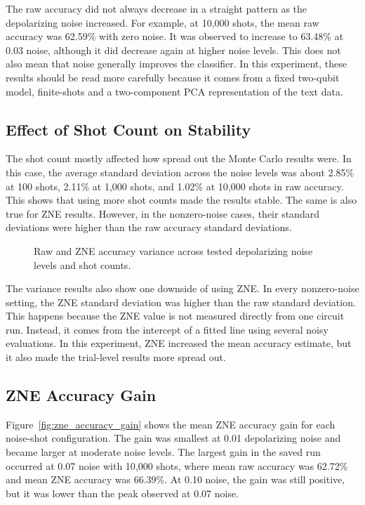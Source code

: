 \documentclass[conference]{IEEEtran}
\begin{document}
The raw accuracy did not always decrease in a straight pattern as the
depolarizing noise increased. For example, at 10{,}000 shots, the mean raw
accuracy was 62.59\% with zero noise. It was observed to increase to 63.48\% at 0.03 noise,
although it did decrease again at higher noise levels. This does not also mean that noise
generally improves the classifier. In this experiment, these results should be read
more carefully because it comes from a fixed two-qubit model, finite-shots
and a two-component PCA representation of the text data.

\subsection{Effect of Shot Count on Stability}

The shot count mostly affected how spread out the Monte Carlo results were. In this case,
the average standard deviation across the noise levels was about 2.85\% at 100 shots, 
2.11\% at 1{,}000 shots, and 1.02\% at 10{,}000 shots in raw accuracy. This
shows that using more shot counts made the results stable. The same is also true for 
ZNE results. However, in the nonzero-noise cases,
their standard deviations were higher than the raw accuracy standard
deviations.

\begin{figure}[H]
\centering

\caption{Raw and ZNE accuracy variance across tested depolarizing noise levels and shot counts.}
\label{fig:raw_vs_zne_variance}
\end{figure}

The variance results also show one downside of using ZNE. In every nonzero-noise
setting, the ZNE standard deviation was higher than the raw standard deviation.
This happens because the ZNE value is not measured directly from one circuit run.
Instead, it comes from the intercept of a fitted line using several noisy
evaluations. In this experiment, ZNE increased the mean accuracy estimate, but it
also made the trial-level results more spread out.

\subsection{ZNE Accuracy Gain}

Figure~\ref{fig:zne_accuracy_gain} shows the mean ZNE accuracy gain for each
noise-shot configuration. The gain was smallest at 0.01 depolarizing noise and
became larger at moderate noise levels. The largest gain in the saved run
occurred at 0.07 noise with 10{,}000 shots, where mean raw accuracy was 62.72\%
and mean ZNE accuracy was 66.39\%. At 0.10 noise, the gain was still positive,
but it was lower than the peak observed at 0.07 noise.
\end{document}
